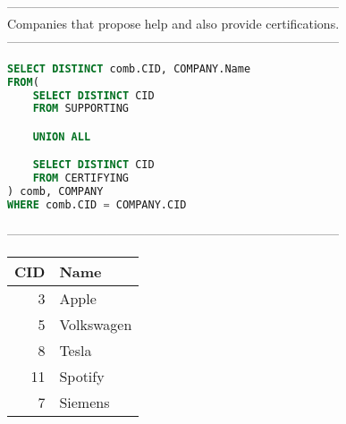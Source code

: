 --------------------------------------------------------------------------------
\\Companies that propose help and also provide certifications.\\
--------------------------------------------------------------------------------
\begin{lstlisting}[language = SQL]
SELECT DISTINCT comb.CID, COMPANY.Name
FROM(
	SELECT DISTINCT CID
	FROM SUPPORTING 

	UNION ALL 

	SELECT DISTINCT CID
	FROM CERTIFYING
) comb, COMPANY
WHERE comb.CID = COMPANY.CID
\end{lstlisting}
--------------------------------------------------------------------------------
\\\begin{tabular}{rl}
\toprule
   CID & Name       \\
\midrule
     3 & Apple      \\
     5 & Volkswagen \\
     8 & Tesla      \\
    11 & Spotify    \\
     7 & Siemens    \\
\bottomrule
\end{tabular}